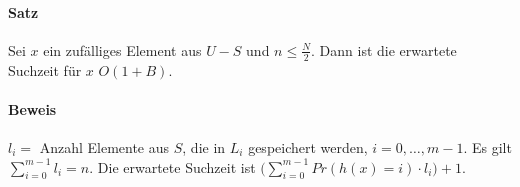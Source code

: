 \paragraph*{Satz} Sei $x$ ein zufälliges Element aus $U-S$ und $n \leq \frac{N}{2}$. Dann ist die erwartete Suchzeit für $x$ $O(1+B)$.

\paragraph*{Beweis} $l_i =$ Anzahl Elemente aus $S$, die in $L_i$ gespeichert werden, $i=0,\dots,m-1$. Es gilt $\sum\limits_{i=0}^{m-1} l_i = n$. Die erwartete Suchzeit ist $\bigg(\sum\limits_{i=0}^{m-1} Pr(h(x)=i) \cdot l_i\bigg)+1$.
